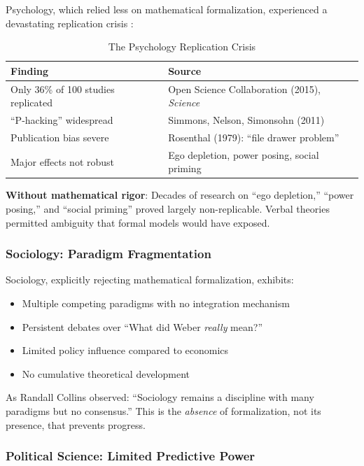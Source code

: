Psychology, which relied less on mathematical formalization, experienced a
devastating replication crisis \citep{collaboration2015estimating}:

\begin{table}[htbp]
\centering
\caption{The Psychology Replication Crisis}
\label{tab:psych-crisis}
\renewcommand{\arraystretch}{1.3}
\small
\begin{tabular}{@{}lp{8cm}@{}}
\toprule
\textbf{Finding} & \textbf{Source} \\
\midrule
Only 36\% of 100 studies replicated & Open Science Collaboration (2015), \textit{Science} \\
``P-hacking'' widespread & Simmons, Nelson, Simonsohn (2011) \\
Publication bias severe & Rosenthal (1979): ``file drawer problem'' \\
Major effects not robust & Ego depletion, power posing, social priming \\
\bottomrule
\end{tabular}
\end{table}

\textbf{Without mathematical rigor}: Decades of research on ``ego depletion,''
``power posing,'' and ``social priming'' proved largely non-replicable.
Verbal theories permitted ambiguity that formal models would have exposed.

\subsubsection{Sociology: Paradigm Fragmentation}

Sociology, explicitly rejecting mathematical formalization, exhibits:
\begin{itemize}[nosep]
    \item Multiple competing paradigms with no integration mechanism
    \item Persistent debates over ``What did Weber \textit{really} mean?''
    \item Limited policy influence compared to economics
    \item No cumulative theoretical development
\end{itemize}

As Randall Collins observed: ``Sociology remains a discipline with many paradigms
but no consensus.'' This is the \textit{absence} of formalization, not its
presence, that prevents progress.

\subsubsection{Political Science: Limited Predictive Power}

